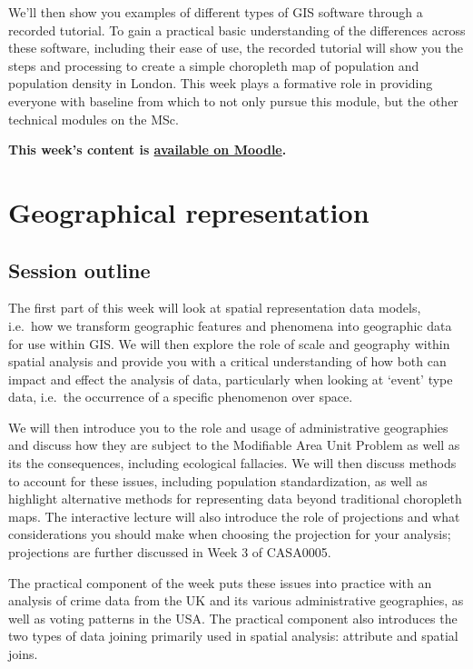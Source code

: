 \documentclass[
]{book}
\begin{document}
We'll then show you examples of different types of GIS software through a recorded tutorial. To gain a practical basic understanding of the differences across these software, including their ease of use, the recorded tutorial will show you the steps and processing to create a simple choropleth map of population and population density in London. This week plays a formative role in providing everyone with baseline from which to not only pursue this module, but the other technical modules on the MSc.

\textbf{This week's content is \href{https://moodle.ucl.ac.uk/}{available on Moodle}.}

\hypertarget{geographical-representation}{%
\chapter{Geographical representation}\label{geographical-representation}}

\hypertarget{session-outline}{%
\section{Session outline}\label{session-outline}}

The first part of this week will look at spatial representation data models, i.e.~how we transform geographic features and phenomena into geographic data for use within GIS. We will then explore the role of scale and geography within spatial analysis and provide you with a critical understanding of how both can impact and effect the analysis of data, particularly when looking at `event' type data, i.e.~the occurrence of a specific phenomenon over space.

We will then introduce you to the role and usage of administrative geographies and discuss how they are subject to the Modifiable Area Unit Problem as well as its the consequences, including ecological fallacies. We will then discuss methods to account for these issues, including population standardization, as well as highlight alternative methods for representing data beyond traditional choropleth maps. The interactive lecture will also introduce the role of projections and what considerations you should make when choosing the projection for your analysis; projections are further discussed in Week 3 of CASA0005.

The practical component of the week puts these issues into practice with an analysis of crime data from the UK and its various administrative geographies, as well as voting patterns in the USA. The practical component also introduces the two types of data joining primarily used in spatial analysis: attribute and spatial joins.
\end{document}
